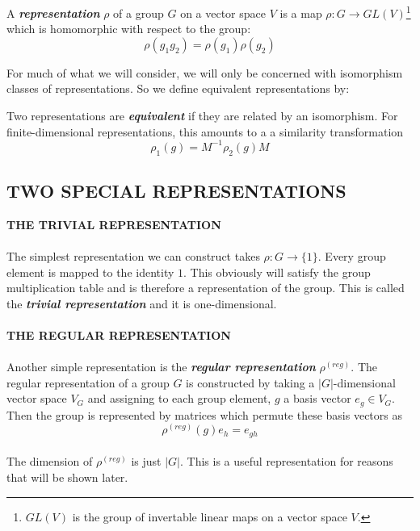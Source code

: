 \documentclass[9 pt]{report}
\begin{document}
\begin{tcolorbox}
A \textbf{\emph{representation}} $\rho$ of a group $G$ on a vector space $V$ is a map $\rho: G\rightarrow GL(V)$\footnote{$GL(V)$ is the group of invertable linear maps on a vector space $V$.} which is homomorphic with respect to the group:
$$ \rho(g_1g_2) = \rho(g_1)\rho(g_2) $$
\end{tcolorbox}
For much of what we will consider, we will only be concerned with isomorphism classes of representations. So we define equivalent representations by:
\begin{tcolorbox}
Two representations are \textbf{\textit{equivalent}} if they are related by an isomorphism. For finite-dimensional representations, this amounts to a a similarity transformation
$$\rho_1(g)=M^{-1}\rho_2(g)M$$
\end{tcolorbox}


{\centering
\subsection*{TWO SPECIAL REPRESENTATIONS}}
\noindent\textbf{THE TRIVIAL REPRESENTATION}
\\
\\
The simplest representation we can construct takes $\rho:G\to \{1\}$. Every group element is mapped to the identity $1$. This obviously will satisfy the group multiplication table and is therefore a representation of the group. This is called the \textbf{\emph{trivial representation}} and it is one-dimensional.
\\
\\
\textbf{THE REGULAR REPRESENTATION}
\\
\\
Another simple representation is the \textbf{\emph{regular representation}} $\rho^{(reg)}$. The regular representation of a group $G$ is constructed by taking a $|G|$-dimensional vector space $V_G$ and assigning to each group element, $g$ a basis vector $e_g\in V_G$. Then the group is represented by matrices which permute these basis vectors as
$$ \rho^{(reg)}(g) e_h = e_{gh} $$
\\
The dimension of $\rho^{(reg)}$ is just $|G|$. This is a useful representation for reasons that will be shown later.
\end{document}
